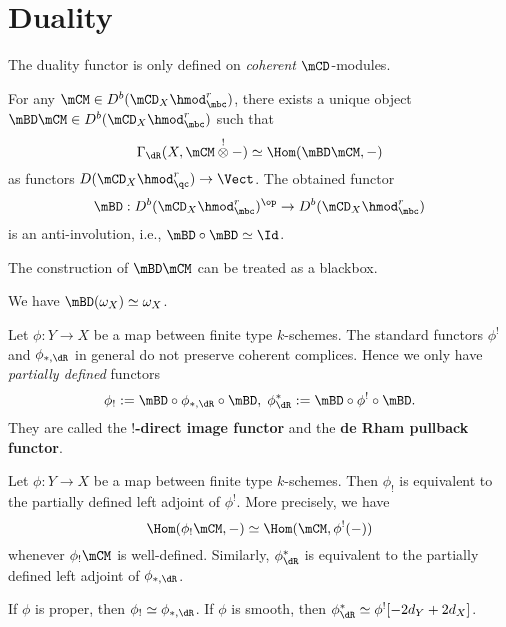 	
\section{Duality}

	The duality functor is only defined on \emph{coherent} $\mCD$-modules.

	\begin{facts}
		For any $\mCM\in D^b(\mCD_X\hmod_\mbc^r)$, there exists a unique object $\mBD \mCM \in D^b(\mCD_X\hmod_\mbc^r) $ such that
		\[
			\Gamma_\dR( X, \mCM \ot^! - ) \simeq \Hom( \mBD\mCM,- )
		\]
		as functors $D(\mCD_X\hmod_\qc^r) \to \Vect$. The obtained functor
		\[
			\mBD: D^b(\mCD_X\hmod_\mbc^r)^\op \to D^b(\mCD_X\hmod_\mbc^r)
		\]
		is an anti-involution, i.e., $\mBD\circ \mBD\simeq \Id$.

	\end{facts}

	\begin{rem}
		The construction of $\mBD\mCM$ can be treated as a blackbox.

	\end{rem}

	\begin{exam}
		We have $\mBD(\omega_X) \simeq \omega_X$.
	\end{exam}
	
	\begin{constr}
		Let $\phi:Y \to X$ be a map between finite type $k$-schemes. The standard functors $\phi^!$ and $\phi_{*,\dR}$ in general do not preserve coherent complices. Hence we only have \emph{partially defined} functors
		\[
			\phi_!:= \mBD \circ \phi_{*,\dR}\circ \mBD,\; \phi_\dR^{*}:=\mBD \circ \phi^!\circ \mBD.
		\]
		They are called the \textbf{$!$-direct image functor} and the \textbf{de Rham pullback functor}.
	\end{constr}

	\begin{facts}
		Let $\phi:Y \to X$ be a map between finite type $k$-schemes. Then $\phi_!$ is equivalent to the partially defined left adjoint of $\phi^!$. More precisely, we have
		\[
			\Hom(\phi_!\mCM,-) \simeq \Hom( \mCM,\phi^!(-) )
		\]
		whenever $\phi_!\mCM$ is well-defined. Similarly, $\phi_\dR^*$ is equivalent to the partially defined left adjoint of $\phi_{*,\dR}$.
	\end{facts}

	\begin{rem}
		If $\phi$ is proper, then $\phi_!\simeq \phi_{*,\dR}$. If $\phi$ is smooth, then $\phi_\dR^* \simeq \phi^![-2d_Y + 2d_X]$.

	\end{rem}

